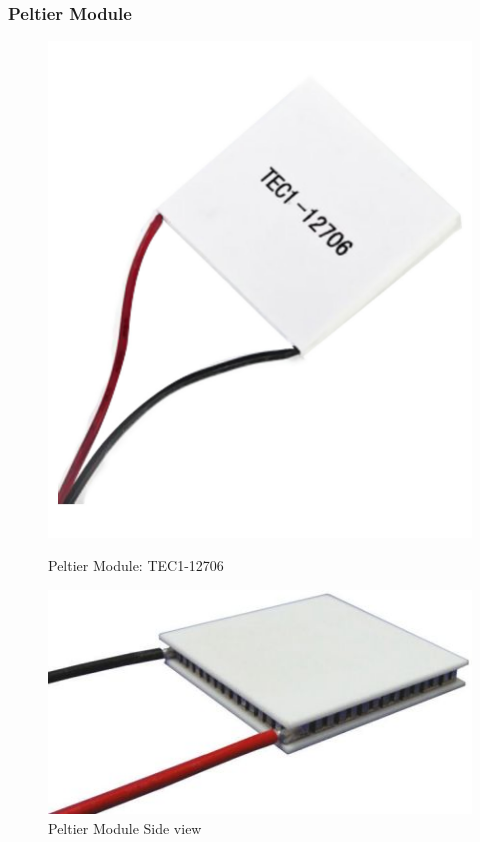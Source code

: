 \documentclass[10pt]{beamer}
\begin{document}
{
	\begin{frame}
		\frametitle{Peltier Module}
		\begin{figure}[h!]
			\begin{minipage}[b]{0.4\linewidth}
				\includegraphics[width=0.8\linewidth]{images/peltier_module1}
				\caption{Peltier Module: TEC1-12706}
			\end{minipage}
			\begin{minipage}[b]{0.4\linewidth}
				\includegraphics[width=0.8\linewidth]{images/peltier_module}
				\caption{Peltier Module Side view}
			\end{minipage}
		\end{figure}
	\end{frame}
}
\end{document}
